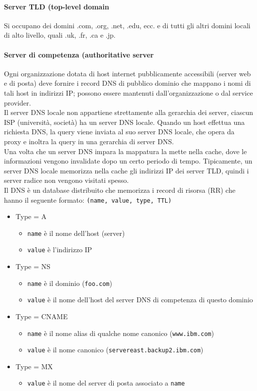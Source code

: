 \documentclass{report}
\newcommand{\code}{\texttt}
\begin{document}
	\paragraph{Server TLD (top-level domain} Si occupano dei domini .com, .org, .net, .edu, ecc. e di tutti gli altri domini locali di alto livello, quali .uk, .fr, .ca e .jp.
	\paragraph{Server di competenza (authoritative server} Ogni organizzazione dotata di host internet pubblicamente accessibili (server web e di posta) deve fornire i record DNS di pubblico dominio che mappano i nomi di tali host in indirizzi IP; possono essere mantenuti dall'organizzazione o dal service provider.
	\medskip\\Il server DNS locale non appartiene strettamente alla gerarchia dei server, ciascun ISP (università, società) ha un server DNS locale. Quando un host effettua una richiesta DNS, la query viene inviata al suo server DNS locale, che opera da proxy e inoltra la query in una gerarchia di server DNS.
	\medskip\\Una volta che un server DNS impara la mappatura la mette nella cache, dove le informazioni vengono invalidate dopo un certo periodo di tempo. Tipicamente, un server DNS locale memorizza nella cache gli indirizzi IP dei server TLD, quindi i server radice non vengono visitati spesso.
	\medskip\\Il DNS è un database distribuito che memorizza i record di risorsa (RR) che hanno il seguente formato: \verb|(name, value, type, TTL)|
	\begin{itemize}
		\item Type = A
		\begin{itemize}
			\item \code{name} è il nome dell'host (server)
			\item \code{value} è l'indirizzo IP
		\end{itemize}
		\item Type = NS
		\begin{itemize}
			\item \code{name} è il dominio (\code{foo.com})
			\item \code{value} è il nome dell'host del server DNS di competenza di questo dominio
		\end{itemize}
		\item Type = CNAME
		\begin{itemize}
			\item \code{name} è il nome alias di qualche nome canonico (\code{www.ibm.com})
			\item \code{value} è il nome canonico (\code{servereast.backup2.ibm.com})
		\end{itemize}
		\item Type = MX
		\begin{itemize}
			\item \code{value} è il nome del server di posta associato a \code{name}
		\end{itemize}
	\end{itemize}
\end{document}
